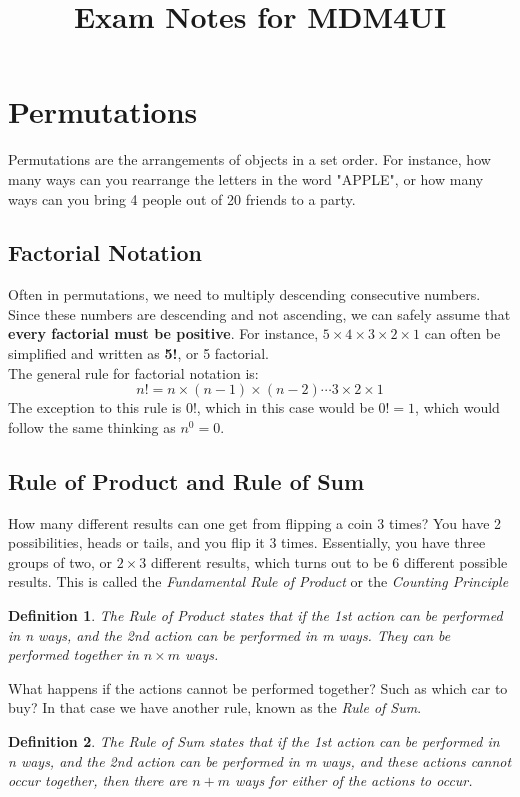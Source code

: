 \documentclass[final,1p,12pt]{elsarticle}
\newtheorem{definition}{Definition}
\begin{document}
\begin{frontmatter}
    \title{Exam Notes for MDM4UI}
    
\end{frontmatter}


\section{Permutations}
Permutations are the arrangements of objects in a set order. 
For instance, how many ways can you rearrange the letters in the word "APPLE", 
or how many ways can you bring 4 people out of 20 friends to a party.

    \subsection{Factorial Notation}
    Often in permutations, we need to multiply descending consecutive numbers. Since these numbers
    are descending and not ascending, we can safely assume that \textbf{every factorial must be positive}. 
    For instance,  $5\times4\times3\times2\times1$ can often be simplified and written as \textbf{5!}, or 5 factorial.\\
    The general rule for factorial notation is: 
    \begin{equation}%
        n! = n\times(n-1)\times(n-2)\cdots3\times2\times1
    \end{equation}
    The exception to this rule is 0!, which in this case would be $0! = 1$, which would follow the same thinking as $n^0=0$.%
    
    \subsection{Rule of Product and Rule of Sum}
    How many different results can one get from flipping a coin 3 times? You have 2 possibilities, heads or tails, and you flip it 3 times. Essentially, you have three groups of two, or $2\times3$ different results, which turns out to be $6$ different possible results. This is called the \emph{Fundamental Rule of Product} or the \emph{Counting Principle}
    \begin{definition}
        The Rule of Product states that if the 1st action can be performed in n ways, and the 2nd action can be performed in m ways.
        They can be performed together in $n\times m$ ways. 
    \end{definition}
    \clearpage
    What happens if the actions cannot be performed together? Such as which car to buy? In that case we have another rule, known as the \emph{Rule of Sum}.
    \begin{definition}
        The Rule of Sum states that if the 1st action can be performed in n ways, and the 2nd action can be performed in m ways, and these actions cannot occur together, then there are $n+m$ ways for either of the actions to occur.
    \end{definition}
    
\end{document}
